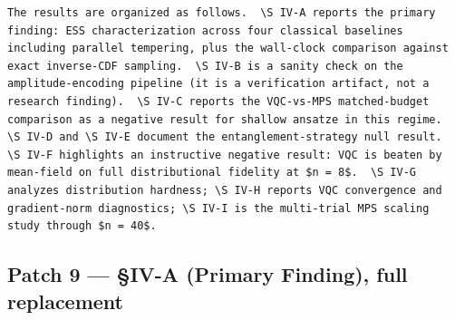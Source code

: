 \begin{verbatim}
The results are organized as follows.  \S IV-A reports the primary
finding: ESS characterization across four classical baselines
including parallel tempering, plus the wall-clock comparison against
exact inverse-CDF sampling.  \S IV-B is a sanity check on the
amplitude-encoding pipeline (it is a verification artifact, not a
research finding).  \S IV-C reports the VQC-vs-MPS matched-budget
comparison as a negative result for shallow ansatze in this regime.
\S IV-D and \S IV-E document the entanglement-strategy null result.
\S IV-F highlights an instructive negative result: VQC is beaten by
mean-field on full distributional fidelity at $n = 8$.  \S IV-G
analyzes distribution hardness; \S IV-H reports VQC convergence and
gradient-norm diagnostics; \S IV-I is the multi-trial MPS scaling
study through $n = 40$.
\end{verbatim}

\subsection*{Patch 9 --- \S IV-A (Primary Finding), full replacement}

